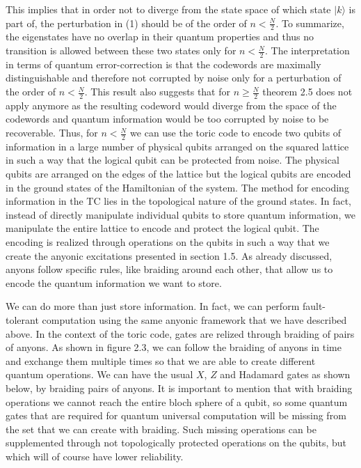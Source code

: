 \documentclass{Configuration_Files/PoliMi3i_thesis}
\begin{document}
This implies that in order not to diverge from the state space of which state $| k \rangle$  is part of, the perturbation in (1) should be of the order of $n < \frac{N}{2}$. To summarize, the eigenstates have no overlap in their quantum properties and thus no transition is allowed between these two states only for $n < \frac{N}{2}$. The interpretation in terms of quantum error-correction is that the codewords are maximally distinguishable and therefore not corrupted by noise only for a perturbation of the order of $n < \frac{N}{2}$. \newline
This result also suggests that for $n \geq \frac{N}{2}$ theorem 2.5 does not apply anymore as the resulting codeword would diverge from the space of the codewords and quantum information would be too corrupted by noise to be recoverable. \newline
\newline
Thus, for $n < \frac{N}{2}$ we can use the toric code to encode two qubits of information in a large number of physical qubits arranged on the squared lattice in such a way that the logical qubit can be protected from noise. The physical qubits are arranged on the edges of the lattice but the logical qubits are encoded in the ground states of the Hamiltonian of the system. 
The method for encoding information in the TC lies in the topological nature of the ground states. In fact, instead of directly manipulate individual qubits to store quantum information, we manipulate the entire lattice to encode and protect the logical qubit. The encoding is realized through operations on the qubits in such a way that we create the anyonic excitations presented in section 1.5. As already discussed, anyons follow specific rules, like braiding around each other, that allow us to encode the quantum information we want to store.\newline 

We can do more than just store information. In fact, we can perform fault-tolerant computation using the same anyonic framework that we have described above. \newline
In the context of the toric code, gates are relized through braiding of pairs of anyons. As shown in figure 2.3, we can follow the braiding of anyons in time and exchange them multiple times so that we are able to create different quantum operations. \newline
We can have the usual $X$, $Z$ and Hadamard gates as shown below, by braiding pairs of anyons. It is important to mention that with braiding operations we cannot reach the entire bloch sphere of a qubit, so some quantum gates that are required for quantum universal computation will be missing from the set that we can create with braiding. Such missing operations can be supplemented through not topologically protected operations on the qubits, but which will of course have lower reliability. \newline
\end{document}
